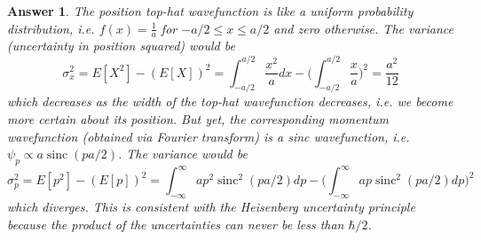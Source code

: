 \documentclass[a4paper]{article}
\DeclareMathOperator{\sinc}{sinc}
\newtheorem{ans}{Answer}[subsection]
\theoremstyle{new}
\begin{document}
\begin{ans}
The position top-hat wavefunction is like a uniform probability distribution, i.e. $f(x)=\frac{1}{a}$ for $-a/2\leq x\leq a/2$ and zero otherwise. The variance (uncertainty in position squared) would be
$$\sigma_x^2=E[X^2]-(E[X])^2=\int_{-a/2}^{a/2}\frac{x^2}{a}dx-\bigg(\int_{-a/2}^{a/2}\frac{x}{a}\bigg)^2=\frac{a^2}{12}$$
which decreases as the width of the top-hat wavefunction decreases, i.e. we become more certain about its position. But yet, the corresponding momentum wavefunction (obtained via Fourier transform) is a sinc wavefunction, i.e. $\psi_p\propto a\sinc(pa/2)$. The variance would be
$$\sigma_p^2=E[p^2]-(E[p])^2=\int_{-\infty}^\infty ap^2\sinc^2(pa/2)dp-\bigg(\int_{-\infty}^{\infty}ap\sinc^2(pa/2)dp\bigg)^2$$
which diverges. This is consistent with the Heisenberg uncertainty principle because the product of the uncertainties can never be less than $\hbar/2$.

\newpage

\end{ans}
\end{document}
